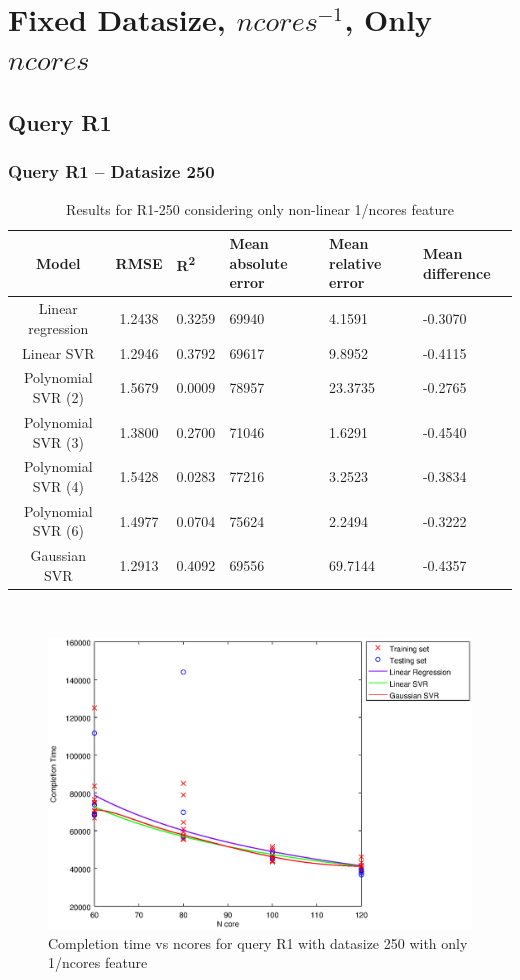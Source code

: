 \documentclass[a4paper,11pt]{article}
\begin{document}

\newpage
\section{Fixed Datasize, $ncores^{-1}$, Only $ncores$}
\subsection{Query R1}
\subsubsection{Query R1 -- Datasize 250}
\begin{table}[H]
	\centering
	\begin{adjustbox}{center}
		\begin{tabular}{c | c M{1.2cm} M{2.5cm} M{2.5cm} M{1.8cm}}
			Model & RMSE & R\textsuperscript{2} & Mean absolute error & Mean relative error & Mean difference \tabularnewline
			\hline
			Linear regression & 1.2438 & 0.3259 &  69940 & 4.1591 & -0.3070 \\
			Linear SVR & 1.2946 & 0.3792 &  69617 & 9.8952 & -0.4115 \\
			Polynomial SVR (2) & 1.5679 & 0.0009 &  78957 & 23.3735 & -0.2765 \\
			Polynomial SVR (3) & 1.3800 & 0.2700 &  71046 & 1.6291 & -0.4540 \\
			Polynomial SVR (4) & 1.5428 & 0.0283 &  77216 & 3.2523 & -0.3834 \\
			Polynomial SVR (6) & 1.4977 & 0.0704 &  75624 & 2.2494 & -0.3222 \\
			Gaussian SVR & 1.2913 & 0.4092 &  69556 & 69.7144 & -0.4357 \\
		\end{tabular}
	\end{adjustbox}
	\\
	\caption{Results for R1-250 considering only non-linear 1/ncores feature}
	\label{table_R1_prediction_all}
\end{table}

\begin {figure}[hbtp]
\centering
\includegraphics[width=\textwidth]{output/R1_250_ONLY_1_OVER_NCORES/plot_R1_250_bestmodels.eps}
\caption {Completion time vs ncores for query R1 with datasize 250 with only 1/ncores feature}
\end {figure}
\end{document}
